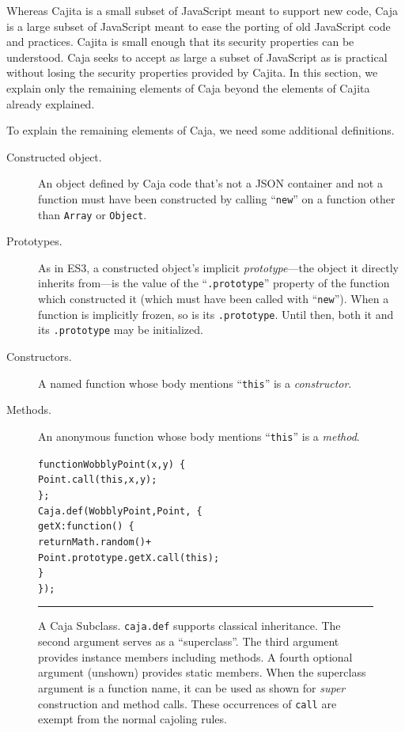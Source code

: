 \documentclass[letterpaper,twocolumn,10pt]{article}
\newcommand{\code}[1]{{\tt {#1}}}              %
\begin{document}
Whereas Cajita is a small subset of JavaScript meant to support new code, 
Caja is a large subset of JavaScript meant to ease the porting of old 
JavaScript code and practices. Cajita is small enough that its security 
properties can be understood. Caja seeks to accept as large a subset of 
JavaScript as is practical without losing the security properties provided by 
Cajita. In this section, we explain only the remaining elements of Caja 
beyond the elements of Cajita already explained.

To explain the remaining elements of Caja, we need some additional 
definitions.

\begin{description}

  \item[Constructed object.] An object defined by Caja code that's not a JSON 
  container and not a function must have been constructed by calling 
  ``\code{new}'' on a function other than \code{Array} or \code{Object}.

  \item[Prototypes.] As in ES3, a constructed object's implicit 
  \emph{prototype}---the object it directly inherits from---is the value of 
  the ``\code{.prototype}'' property of the function which constructed it 
  (which must have been called with ``\code{new}''). When a function is 
  implicitly frozen, so is its \code{.prototype}. Until then, both it and its 
  \code{.prototype} may be initialized. 

  \item[Constructors.] A named function whose body mentions ``\code{this}'' 
  is a \emph{constructor}. 
    
  \item[Methods.] An anonymous function whose body mentions ``\code{this}'' 
  is a \emph{method}. 
  
\end{description}


\begin{figure}[t!]
\begin{alltt}
function WobblyPoint(x, y)\ \{
  Point.call(this, x, y);
\};
Caja.def(WobblyPoint, Point,\ \{
  getX: function()\ \{ 
    return Math.random() +
      Point.prototype.getX.call(this); 
  \}
\});
\end{alltt}

\caption[A Caja Subclass.]{A Caja Subclass. \code{caja.def} supports 
classical inheritance. The second argument serves as a ``superclass''. The 
third argument provides instance members including methods. A fourth optional 
argument (unshown) provides static members. When the superclass argument is a 
function name, it can be used as shown for \emph{super} construction and 
method calls. These occurrences of \code{call} are exempt from the normal 
cajoling rules. \\ } \hrule
\label{fig:caja-subclass}
\end{figure}
\end{document}
